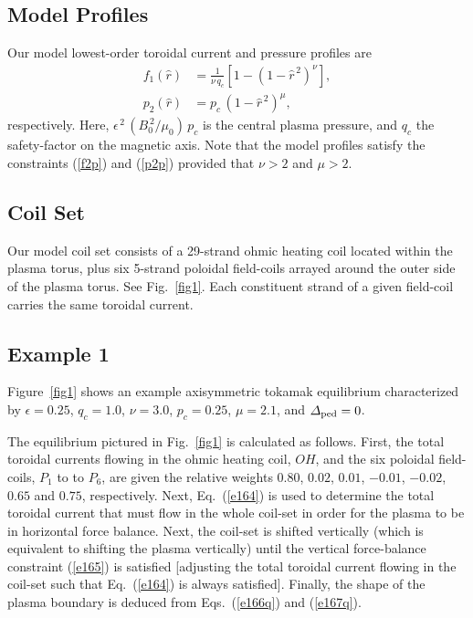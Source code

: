 \documentclass[12pt,prb,aps]{revtex4-1}
\begin{document}
\subsection{Model Profiles}
Our model lowest-order toroidal current  and pressure profiles are\,\cite{wesson1}
\begin{align}
f_1(\hat{r}) &= \frac{1}{\nu\,q_c}\left[1-(1-\hat{r}^{\,2})^\nu\right],\\[0.5ex]
p_2(\hat{r}) &= p_c\,(1-\hat{r}^{\,2})^\mu,
\end{align}
respectively. 
Here, $\epsilon^{\,2}\,(B_0^{\,2}/\mu_0)\,p_c$ is the central plasma pressure, and $q_c$  the safety-factor on the magnetic axis. 
Note that the model profiles satisfy the constraints (\ref{f2p}) and (\ref{p2p}) provided that $\nu>2$ and $\mu>2$.

\subsection{Coil Set}
Our model coil set consists of a 29-strand ohmic heating coil located within the plasma torus, plus six 5-strand poloidal field-coils arrayed around the
outer side of the plasma torus. See Fig.~\ref{fig1}. Each constituent strand of a given field-coil carries the same toroidal current. 

\subsection{Example 1}
Figure~\ref{fig1} shows an example axisymmetric tokamak equilibrium  characterized by $\epsilon=0.25$, $q_c=1.0$, $\nu=3.0$, $p_c=0.25$, $\mu=2.1$,
and ${\mit\Delta}_{\rm ped}=0$. 

The equilibrium pictured in Fig.~\ref{fig1}  is calculated  as follows. First, the total toroidal currents flowing in the ohmic heating coil, $OH$,  and the
six poloidal field-coils, $P_1$ to to $P_6$,  are given the relative weights $0.80$, $0.02$, $0.01$, $-0.01$, $-0.02$, $0.65$ and $0.75$, respectively. 
Next, Eq.~(\ref{e164}) is used to determine the total toroidal current that must flow in the whole coil-set in  order for the plasma to be in horizontal
force balance. Next, the coil-set is shifted vertically (which is equivalent to shifting the plasma vertically) until the vertical 
force-balance constraint (\ref{e165}) is satisfied [adjusting the total toroidal current flowing in the coil-set such that Eq.~(\ref{e164}) is always satisfied].
Finally, the shape of the plasma boundary is deduced from Eqs.~(\ref{e166q}) and (\ref{e167q}).
\end{document}
